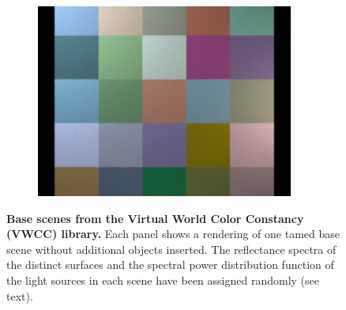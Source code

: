 \documentclass{jov}
\begin{document}
\begin{figure}[t]
\begin{subfigure}[b]{0.22 \textwidth}
        \includegraphics[width=\textwidth]{../FiguresDraft4/Figure3/Figure3_f.png}
        \label{fig:baseSceneCheckerBoard}
    \end{subfigure}
    \caption{{\bf Base scenes from the Virtual World Color Constancy (VWCC) library.} Each panel shows a rendering of one tamed base scene without additional objects inserted.  The reflectance spectra of the distinct surfaces and the spectral power distribution function of the light sources in each scene have been assigned randomly (see text).}\label{fig:baseScenes}
\end{figure}
\end{document}

